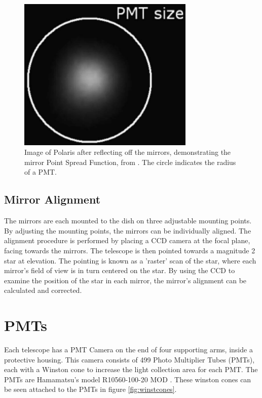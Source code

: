 \begin{figure}[ht]
  \begin{center}
    \includegraphics[width=0.75\textwidth]{images/mirror_polaris.eps}
    \caption[Polaris PSF]{Image of Polaris after reflecting off the mirrors, demonstrating the mirror Point Spread Function, from \cite{Veritas_Detector}.  The circle indicates the radius of a PMT.}\label{fig:mirrorpolaris}
  \end{center}
\end{figure}

\subsection{Mirror Alignment}
The mirrors are each mounted to the dish on three adjustable mounting points.
By adjusting the mounting points, the mirrors can be individually aligned.
The alignment procedure is performed by placing a CCD camera at the focal plane, facing towards the mirrors.
The telescope is then pointed towards a magnitude 2 star at \degree elevation.
The pointing is known as a 'raster' scan of the star, where each mirror's field of view is in turn centered on the star.
By using the CCD to examine the position of the star in each mirror, the mirror's alignment can be calculated and corrected.



\section{PMTs}\label{sec:pmts}

Each telescope has a PMT Camera on the end of four supporting arms, inside a protective housing.
This camera consists of 499 Photo Multiplier Tubes (PMTs), each with a Winston cone to increase the light collection area for each PMT.
The PMTs are Hamamatsu's model R10560-100-20 MOD \cite{pmtmodels}.
These winston cones can be seen attached to the PMTs in figure \ref{fig:winstcones}.


